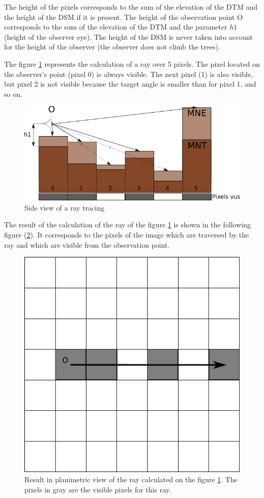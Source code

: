 \documentclass{report}
\begin{document}
The height of the pixels corresponds to the sum of the elevation of the DTM and the height of the DSM if it is present. The height of the observation point O corresponds to the sum of the elevation of the DTM and the parameter $h1$ (height of the observer eye). The height of the DSM is never taken into account for the height of the observer (the observer does not climb the trees).

The figure \ref{ray_side} represents the calculation of a ray over 5 pixels. The pixel located on the observer's point (pixel 0) is always visible. The next pixel (1) is also visible, but pixel 2 is not visible because the target angle is smaller than for pixel 1, and so on.

\begin{figure}[H]
	\includegraphics{img/ray_side-fr.pdf} 
	\caption{Side view of a ray tracing}
	\label{ray_side}
\end{figure}

The result of the calculation of the ray of the figure \ref{ray_side} is shown in the following figure (\ref {grid_result}). It corresponds to the pixels of the image which are traversed by the ray and which are visible from the observation point.

\begin{figure}[H]
	\includegraphics[scale=0.8]{img/grid_result.pdf} 
	\caption{Result in planimetric view of the ray calculated on the figure \ref{ray_side}. The pixels in gray are the visible pixels for this ray.}
	\label{grid_result}
\end{figure}
\end{document}

